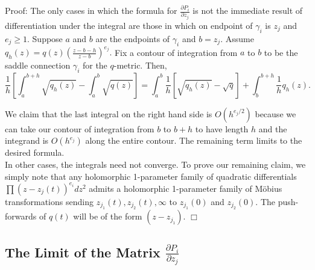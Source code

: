 \documentclass[12pt]{article}
\begin{document}
\noindent Proof: The only cases in which the formula for $\frac{\partial P_i}{\partial z_j}$ is not the immediate result of differentiation under the integral are those in which on endpoint of $\gamma_i$ is $z_j$ and $e_j \geq 1$. Suppose $a$ and $b$ are the endpoints of $\gamma_i$ and $b = z_j$. Assume $q_h(z) = q(z)\left(\frac{z - b - h}{z - b}\right)^{e_j}.$ Fix a contour of integration from $a$ to $b$ to be the saddle connection $\gamma_i$ for the $q$-metric. Then, $$\frac{1}{h}\left[\int_a^{b+h} \sqrt{q_h(z)} - \int_a^b \sqrt{q(z)}\right] = \int_a^b \frac{1}{h}[\sqrt{q_h(z)} - \sqrt{q}] + \int_b^{b+h}\frac{1}{h}q_h(z).$$

\noindent We claim that the last integral on the right hand side is $O(h^{e_j/2})$ because we can take our contour of integration from $b$ to $b+h$ to have length $h$ and the integrand is $O(h^{e_j})$ along the entire contour. The remaining term limits to the desired formula.\\

\noindent In other cases, the integrals need not converge. To prove our remaining claim, we simply note that any holomorphic 1-parameter family of quadratic differentials $\prod(z - z_j(t))^{e_i}dz^2$ admits a holomorphic 1-parameter family of M\"obius transformations sending $z_{j_1}(t),z_{j_2}(t),\infty$ to $z_{j_1}(0)$ and $z_{j_2}(0)$. The push-forwards of $q(t)$ will be of the form $(z-z_{j_1})$. $\Box$

\subsection{The Limit of the Matrix $\frac{\partial P_i}{\partial z_j}$}
\end{document}
